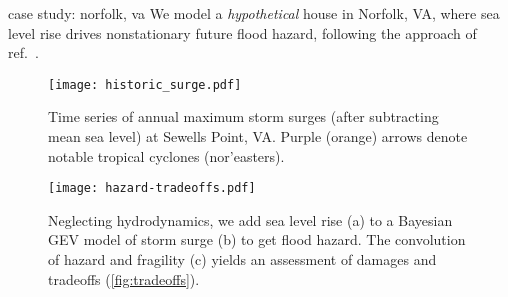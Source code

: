 \begin{block}{case study: norfolk, va}
    We model a \emph{hypothetical} house in Norfolk, VA, where sea level rise drives nonstationary future flood hazard, following the approach of ref.~\cite{zarekarizi_suboptimal:2020}.
    \begin{framed}
        \begin{figure}
            \centering
            \texttt{[image: historic\_surge.pdf]}
            \caption{
                Time series of annual maximum storm surges (after subtracting mean sea level) at Sewells Point, VA.
                Purple (orange) arrows denote notable tropical cyclones (nor'easters).
            }
            \label{fig:observations}
        \end{figure}
    \end{framed}
    \vspace*{-1em}
    \begin{framed}
        \begin{figure}
            \centering
            \texttt{[image: hazard-tradeoffs.pdf]}
            \caption{
                Neglecting hydrodynamics, we add sea level rise (a) to a Bayesian GEV model of storm surge (b) to get flood hazard.
                The convolution of hazard and fragility (c) yields an assessment of damages and tradeoffs (\cref{fig:tradeoffs}).
            }
        \end{figure}
    \end{framed}
\end{block}